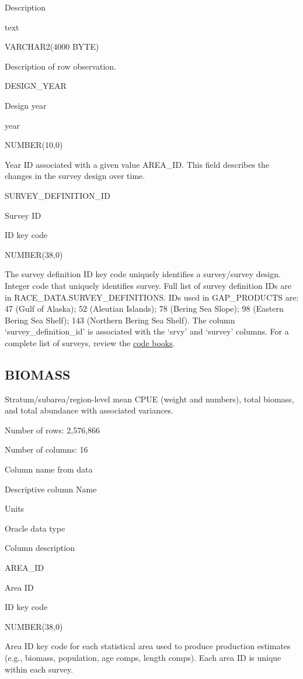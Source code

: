 \documentclass[
  letterpaper,
  oneside,
  open=any]{scrbook}
\begin{document}
Description

text

VARCHAR2(4000 BYTE)

Description of row observation.

DESIGN\_YEAR

Design year

year

NUMBER(10,0)

Year ID associated with a given value AREA\_ID. This field describes the
changes in the survey design over time.

SURVEY\_DEFINITION\_ID

Survey ID

ID key code

NUMBER(38,0)

The survey definition ID key code uniquely identifies a survey/survey
design. Integer code that uniquely identifies survey. Full list of
survey definition IDs are in RACE\_DATA.SURVEY\_DEFINITIONS. IDs used in
GAP\_PRODUCTS are: 47 (Gulf of Alaska); 52 (Aleutian Islands); 78
(Bering Sea Slope); 98 (Eastern Bering Sea Shelf); 143 (Northern Bering
Sea Shelf). The column `survey\_definition\_id' is associated with the
`srvy' and `survey' columns. For a complete list of surveys, review the
\href{https://www.fisheries.noaa.gov/resource/document/groundfish-survey-species-code-manual-and-data-codes-manual}{code
books}.

\hypertarget{biomass}{%
\subsection{BIOMASS}\label{biomass}}

Stratum/subarea/region-level mean CPUE (weight and numbers), total
biomass, and total abundance with associated variances.

Number of rows: 2,576,866

Number of columns: 16

Column name from data

Descriptive column Name

Units

Oracle data type

Column description

AREA\_ID

Area ID

ID key code

NUMBER(38,0)

Area ID key code for each statistical area used to produce production
estimates (e.g., biomass, population, age comps, length comps). Each
area ID is unique within each survey.
\end{document}

